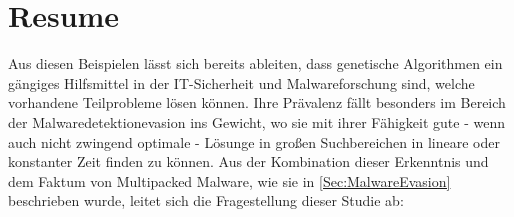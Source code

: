 \section{Resume}

Aus diesen Beispielen lässt sich bereits ableiten, dass genetische Algorithmen ein gängiges Hilfsmittel in der IT-Sicherheit und Malwareforschung sind, welche vorhandene Teilprobleme lösen können. Ihre Prävalenz fällt besonders im Bereich der Malwaredetektionevasion ins Gewicht, wo sie mit ihrer Fähigkeit gute - wenn auch nicht zwingend optimale - Lösunge in großen Suchbereichen in lineare oder konstanter Zeit finden zu können.
Aus der Kombination dieser Erkenntnis und dem Faktum von Multipacked Malware, wie sie in \ref{Sec:MalwareEvasion} beschrieben wurde, leitet sich die Fragestellung dieser Studie ab: